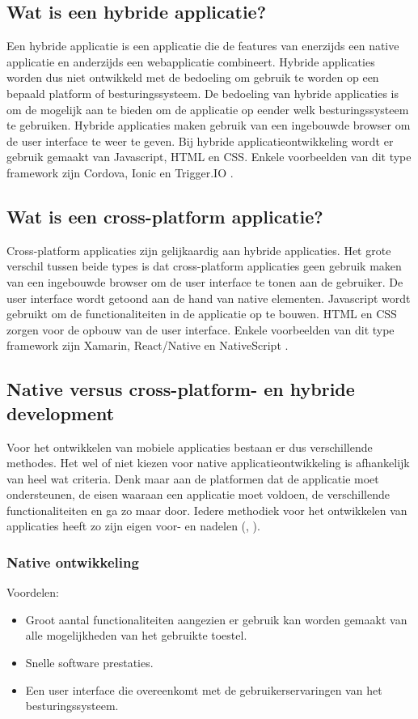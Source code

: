 \subsection{Wat is een hybride applicatie?}
Een hybride applicatie is een applicatie die de features van enerzijds een native applicatie en anderzijds een webapplicatie combineert. Hybride applicaties worden dus niet ontwikkeld met de bedoeling om gebruik te worden op een bepaald platform of besturingssysteem. De bedoeling van hybride applicaties is om de mogelijk aan te bieden om de applicatie op eender welk besturingssysteem te gebruiken. Hybride applicaties maken gebruik van een ingebouwde browser om de user interface te weer te geven. Bij hybride applicatieontwikkeling wordt er gebruik gemaakt van Javascript, HTML en CSS. Enkele voorbeelden van dit type framework zijn Cordova, Ionic en Trigger.IO \autocite{MeaningHybridApp}.

\subsection{Wat is een cross-platform applicatie?}
Cross-platform applicaties zijn gelijkaardig aan hybride applicaties. Het grote verschil tussen beide types is dat cross-platform applicaties geen gebruik maken van een ingebouwde browser om de user interface te tonen aan de gebruiker. De user interface wordt getoond aan de hand van native elementen. Javascript wordt gebruikt om de functionaliteiten in de applicatie op te bouwen. HTML en CSS zorgen voor de opbouw van de user interface. Enkele voorbeelden van dit type framework zijn Xamarin, React/Native en NativeScript \autocite{NativeVsCross2}.

\subsection{Native versus cross-platform- en hybride development}
\label{sec:nativeversuscross}
Voor het ontwikkelen van mobiele applicaties bestaan er dus verschillende methodes. Het wel of niet kiezen voor native applicatieontwikkeling is afhankelijk van heel wat criteria. Denk maar aan de platformen dat de applicatie moet ondersteunen, de eisen waaraan een applicatie moet voldoen, de verschillende functionaliteiten en ga zo maar door. Iedere methodiek voor het ontwikkelen van applicaties heeft zo zijn eigen voor- en nadelen (\textcite{NativeVsCross2}, \textcite{NativeVsCross3}).

\subsubsection{Native ontwikkeling}
Voordelen:
\begin{itemize}
	\item Groot aantal functionaliteiten aangezien er gebruik kan worden gemaakt van alle mogelijkheden van het gebruikte toestel.
	\item Snelle software prestaties.
	\item Een user interface die overeenkomt met de gebruikerservaringen van het besturingssysteem.
\end{itemize}

